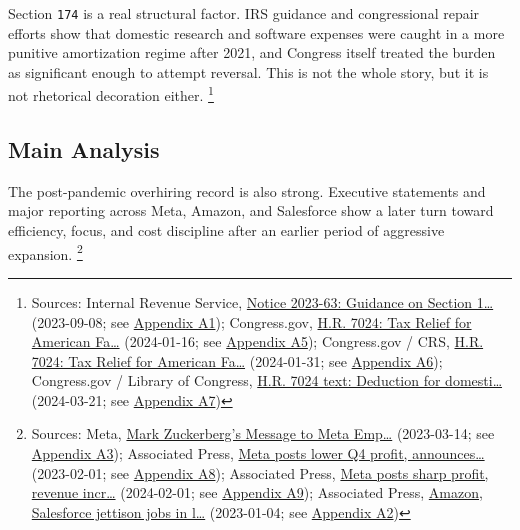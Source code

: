 \documentclass[
  american,
  11pt,
  letterpaper,
]{article}
\begin{document}
Section \texttt{174} is a real structural factor. IRS guidance and
congressional repair efforts show that domestic research and software
expenses were caught in a more punitive amortization regime after 2021,
and Congress itself treated the burden as significant enough to attempt
reversal. This is not the whole story, but it is not rhetorical
decoration either. \footnote{Sources: Internal Revenue Service,
  \href{https://www.irs.gov/pub/irs-drop/n-23-63.pdf}{Notice 2023-63:
  Guidance on Section 1\ldots{}} (2023-09-08; see
  \hyperref[appendix-a1-notice-2023-63-guidance-on-section-174-and-specified-research-or-experimental-expenditures]{Appendix
  A1}); Congress.gov,
  \href{https://www.congress.gov/bill/118th-congress/house-bill/7024}{H.R.
  7024: Tax Relief for American Fa\ldots{}} (2024-01-16; see
  \hyperref[appendix-a5-h-r-7024-tax-relief-for-american-families-and-workers-act-of-2024]{Appendix
  A5}); Congress.gov / CRS,
  \href{https://www.congress.gov/bill/118th-congress/house-bill/7024}{H.R.
  7024: Tax Relief for American Fa\ldots{}} (2024-01-31; see
  \hyperref[appendix-a6-h-r-7024-tax-relief-for-american-families-and-workers-act-of-2024-crs-summary]{Appendix
  A6}); Congress.gov / Library of Congress,
  \href{https://www.congress.gov/bill/118th-congress/house-bill/7024/text}{H.R.
  7024 text: Deduction for domesti\ldots{}} (2024-03-21; see
  \hyperref[appendix-a7-h-r-7024-text-deduction-for-domestic-research-and-experimental-expenditures]{Appendix
  A7})}

\subsection{Main Analysis}\label{main-analysis}

The post-pandemic overhiring record is also strong. Executive statements
and major reporting across Meta, Amazon, and Salesforce show a later
turn toward efficiency, focus, and cost discipline after an earlier
period of aggressive expansion. \footnote{Sources: Meta,
  \href{https://about.fb.com/news/2023/03/mark-zuckerberg-meta-year-of-efficiency/}{Mark
  Zuckerberg's Message to Meta Emp\ldots{}} (2023-03-14; see
  \hyperref[appendix-a3-mark-zuckerberg-s-message-to-meta-employees]{Appendix
  A3}); Associated Press,
  \href{https://apnews.com/article/b884c9ac96be1c22f81d7243176a321d}{Meta
  posts lower Q4 profit, announces\ldots{}} (2023-02-01; see
  \hyperref[appendix-a8-meta-posts-lower-q4-profit-announces-huge-stock-buyback]{Appendix
  A8}); Associated Press,
  \href{https://apnews.com/article/abc3e389d97fb97c661ccb6acfcf65c7}{Meta
  posts sharp profit, revenue incr\ldots{}} (2024-02-01; see
  \hyperref[appendix-a9-meta-posts-sharp-profit-revenue-increase-in-q4-thanks-to-cost-cuts-and-advertising-rebound]{Appendix
  A9}); Associated Press,
  \href{https://apnews.com/article/bbb2f3a09eafdfc7cda54a3b87e538ad}{Amazon,
  Salesforce jettison jobs in l\ldots{}} (2023-01-04; see
  \hyperref[appendix-a2-amazon-salesforce-jettison-jobs-in-latest-tech-worker-purge]{Appendix
  A2})}
\end{document}
